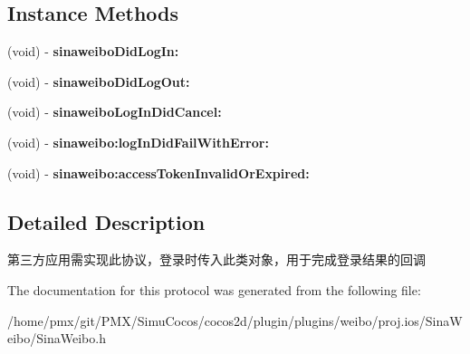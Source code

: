 \subsection*{Instance Methods}
\begin{DoxyCompactItemize}
\item 
\mbox{\label{protocolSinaWeiboDelegate_01-p_ac2c86eac35203feffeb0e338859350af}} 
(void) -\/ {\bfseries sinaweibo\+Did\+Log\+In\+:}
\item 
\mbox{\label{protocolSinaWeiboDelegate_01-p_a160484713fbbb4de960fbf111407d1de}} 
(void) -\/ {\bfseries sinaweibo\+Did\+Log\+Out\+:}
\item 
\mbox{\label{protocolSinaWeiboDelegate_01-p_ade311e7ae4d274948256308b021e6637}} 
(void) -\/ {\bfseries sinaweibo\+Log\+In\+Did\+Cancel\+:}
\item 
\mbox{\label{protocolSinaWeiboDelegate_01-p_ad1b0b4a3d2c1118359fe086825e0cf73}} 
(void) -\/ {\bfseries sinaweibo\+:log\+In\+Did\+Fail\+With\+Error\+:}
\item 
\mbox{\label{protocolSinaWeiboDelegate_01-p_aefd1c3309aef30464c69327cde5e3057}} 
(void) -\/ {\bfseries sinaweibo\+:access\+Token\+Invalid\+Or\+Expired\+:}
\end{DoxyCompactItemize}


\subsection{Detailed Description}
第三方应用需实现此协议，登录时传入此类对象，用于完成登录结果的回调 

The documentation for this protocol was generated from the following file\+:\begin{DoxyCompactItemize}
\item 
/home/pmx/git/\+P\+M\+X/\+Simu\+Cocos/cocos2d/plugin/plugins/weibo/proj.\+ios/\+Sina\+Weibo/Sina\+Weibo.\+h\end{DoxyCompactItemize}
